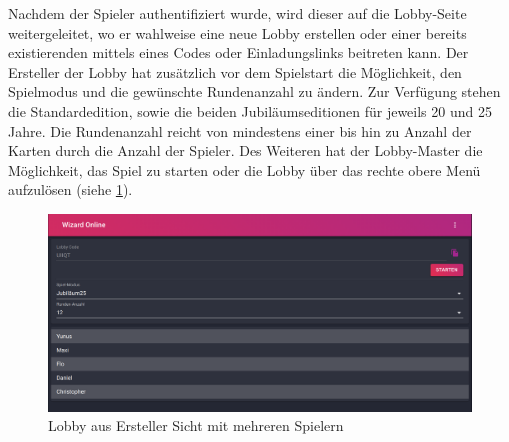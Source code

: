 Nachdem der Spieler authentifiziert wurde, wird dieser auf die Lobby-Seite weitergeleitet, wo er wahlweise eine neue Lobby erstellen oder einer bereits existierenden mittels eines Codes oder Einladungslinks beitreten kann. Der Ersteller der Lobby hat zusätzlich vor dem Spielstart die Möglichkeit, den Spielmodus und die gewünschte Rundenanzahl zu ändern. Zur Verfügung stehen die Standardedition, sowie die beiden Jubiläumseditionen für jeweils 20 und 25 Jahre. Die Rundenanzahl reicht von mindestens einer bis hin zu Anzahl der Karten durch die Anzahl der Spieler. Des Weiteren hat der Lobby-Master die Möglichkeit, das Spiel zu starten oder die Lobby über das rechte obere Menü aufzulösen (siehe \cref{fig:lobby}).

\begin{figure}[h]
	\includegraphics[width=\textwidth]{images/lobby.png}
	\caption{Lobby aus Ersteller Sicht mit mehreren Spielern}
	\label{fig:lobby}
\end{figure}

